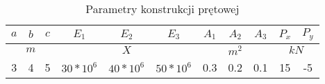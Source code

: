 \begin{table}[!htbp]
    \centering
    \begin{tabular}{|c|c|c|c|c|c|c|c|c|c|c|}
        \hline
        $a$ & $b$ & $c$ & $E_1$ & $E_2$ & $E_3$ & $A_1$ & $A_2$ & $A_3$ & $P_x$ & $P_y$ \\
        \hline
        \multicolumn{3}{|c|}{$m$} & \multicolumn{3}{|c|}{$X$} & \multicolumn{3}{|c|}{$m^2$} & \multicolumn{2}{|c|}{$kN$} \\
        \hline
        3 & 4 & 5 & $30*10^6$ & $40*10^6$ & $50*10^6$ & 0.3 & 0.2 & 0.1 & 15 & -5 \\
        \hline
    \end{tabular}
    \caption{Parametry konstrukcji prętowej}
    \label{tab:pars-kp}
\end{table}
